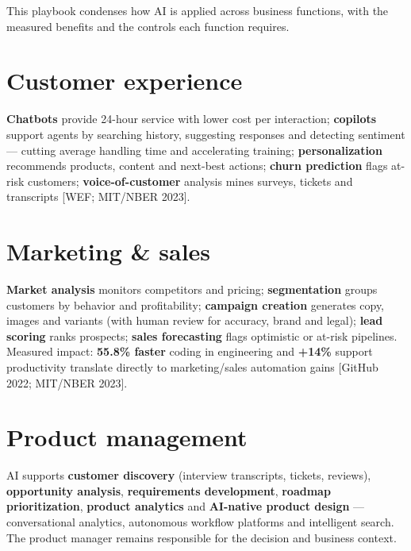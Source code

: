 
This playbook condenses how AI is applied across business functions, with the
measured benefits and the controls each function requires.

\section{Customer experience}

\textbf{Chatbots} provide 24-hour service with lower cost per interaction;
\textbf{copilots} support agents by searching history, suggesting responses
and detecting sentiment — cutting average handling time and accelerating
training; \textbf{personalization} recommends products, content and
next-best actions; \textbf{churn prediction} flags at-risk customers;
\textbf{voice-of-customer} analysis mines surveys, tickets and transcripts
[WEF; MIT/NBER 2023].

\section{Marketing \& sales}

\textbf{Market analysis} monitors competitors and pricing; \textbf{segmentation}
groups customers by behavior and profitability; \textbf{campaign creation}
generates copy, images and variants (with human review for accuracy, brand
and legal); \textbf{lead scoring} ranks prospects; \textbf{sales forecasting}
flags optimistic or at-risk pipelines. Measured impact: \textbf{55.8\% faster}
coding in engineering and \textbf{+14\%} support productivity translate
directly to marketing/sales automation gains [GitHub 2022; MIT/NBER 2023].

\section{Product management}

AI supports \textbf{customer discovery} (interview transcripts, tickets,
reviews), \textbf{opportunity analysis}, \textbf{requirements development},
\textbf{roadmap prioritization}, \textbf{product analytics} and
\textbf{AI-native product design} — conversational analytics, autonomous
workflow platforms and intelligent search. The product manager remains
responsible for the decision and business context.

